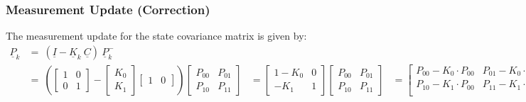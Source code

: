 \subsubsection{Measurement Update (Correction)}
The measurement update for the state covariance matrix is given by:
\[
\begin{aligned}
	\underline{P}_{k} &= \ (\underline{I} - \underline{K}_{k} \ \underline{C}) \ \underline{P}_{k}^- \\ 
	&= \ \left( \begin{bmatrix} 
		1 & 0 \\ 
		0 & 1 
	\end{bmatrix}
	- 
	\begin{bmatrix} 
		K_{0} \\  
		K_{1} 
	\end{bmatrix} 
	\begin{bmatrix} 
		1 & 0 
	\end{bmatrix}  
	\right) 
	\begin{bmatrix}
		P_{00} & P_{01} \\ 
		P_{10} & P_{11} 
	\end{bmatrix} 
	&=  
	\begin{bmatrix} 
		1 - K_{0} & 0 \\ 
		-K_{1} & 1 
	\end{bmatrix} 
	\begin{bmatrix} 
		P_{00} & P_{01} \\ 
		P_{10} & P_{11} 
	\end{bmatrix}
	&= 
	\begin{bmatrix} 
		P_{00} - K_{0} \cdot P_{00} & P_{01} - K_{0} \cdot P_{01} \\
		P_{10} - K_{1} \cdot P_{00} & P_{11} - K_{1} \cdot P_{01} \\
	\end{bmatrix}
\end{aligned}
\]

